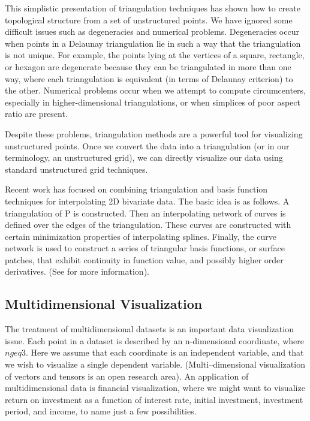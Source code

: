 \begin{description}[leftmargin=0cm,labelindent=0cm]
This simplistic presentation of triangulation techniques has shown how to create topological structure from a set of unstructured points. We have ignored some difficult issues such as degeneracies and numerical problems. Degeneracies occur when points in a Delaunay triangulation lie in such a way that the triangulation is not unique. For example, the points lying at the vertices of a square, rectangle, or hexagon are degenerate because they can be triangulated in more than one way, where each triangulation is equivalent (in terms of Delaunay criterion) to the other. Numerical problems occur when we attempt to compute circumcenters, especially in higher-dimensional triangulations, or when simplices of poor aspect ratio are present.

Despite these problems, triangulation methods are a powerful tool for visualizing unstructured points. Once we convert the data into a triangulation (or in our terminology, an unstructured grid), we can directly visualize our data using standard unstructured grid techniques.

\item[Hybrid Techniques.] Recent work has focused on combining triangulation and basis function techniques for interpolating 2D bivariate data. The basic idea is as follows. A triangulation of P is constructed. Then an interpolating network of curves is defined over the edges of the triangulation. These curves are constructed with certain minimization properties of interpolating splines. Finally, the curve network is used to construct a series of triangular basis functions, or surface patches, that exhibit continuity in function value, and possibly higher order derivatives. (See \cite{Nielson91a} for more information).

\end{description}

\subsection{Multidimensional Visualization}

The treatment of multidimensional datasets is an important data visualization issue. Each point in a dataset is described by an n-dimensional coordinate, where $n geq 3$. Here we assume that each coordinate is an independent variable, and that we wish to visualize a single dependent variable. (Multi--dimensional visualization of vectors and tensors is an open research area). An application of multidimensional data is financial visualization, where we might want to visualize return on investment as a function of interest rate, initial investment, investment period, and income, to name just a few possibilities.


